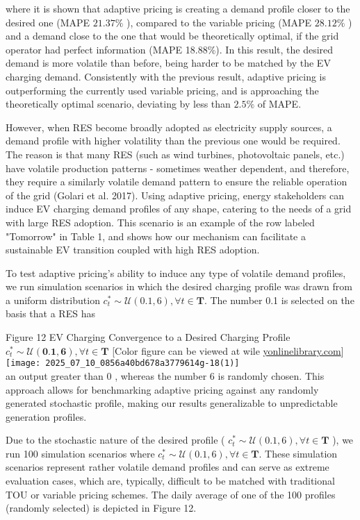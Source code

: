 \documentclass[10pt]{article}
\begin{document}
where it is shown that adaptive pricing is creating a demand profile closer to the desired one (MAPE $21.37 \%$ ), compared to the variable pricing (MAPE $28.12 \%$ ) and a demand close to the one that would be theoretically optimal, if the grid operator had perfect information (MAPE 18.88\%). In this result, the desired demand is more volatile than before, being harder to be matched by the EV charging demand. Consistently with the previous result, adaptive pricing is outperforming the currently used variable pricing, and is approaching the theoretically optimal scenario, deviating by less than $2.5 \%$ of MAPE.

However, when RES become broadly adopted as electricity supply sources, a demand profile with higher volatility than the previous one would be required. The reason is that many RES (such as wind turbines, photovoltaic panels, etc.) have volatile production patterns - sometimes weather dependent, and therefore, they require a similarly volatile demand pattern to ensure the reliable operation of the grid (Golari et al. 2017). Using adaptive pricing, energy stakeholders can induce EV charging demand profiles of any shape, catering to the needs of a grid with large RES adoption. This scenario is an example of the row labeled "Tomorrow" in Table 1, and shows how our mechanism can facilitate a sustainable EV transition coupled with high RES adoption.

To test adaptive pricing's ability to induce any type of volatile demand profiles, we run simulation scenarios in which the desired charging profile was drawn from a uniform distribution $c_{t}^{*} \sim \mathcal{U}(0.1,6), \forall t \in \mathbf{T}$. The number 0.1 is selected on the basis that a RES has

Figure 12 EV Charging Convergence to a Desired Charging Profile $c_{t}^{*} \sim \mathcal{U}(\mathbf{0 . 1}, \mathbf{6}), \forall t \in \mathbf{T}$ [Color figure can be viewed at wile \href{http://yonlinelibrary.com}{yonlinelibrary.com}]\\
\texttt{[image: 2025\_07\_10\_0856a40bd678a3779614g-18(1)]}\\
an output greater than 0 , whereas the number 6 is randomly chosen. This approach allows for benchmarking adaptive pricing against any randomly generated stochastic profile, making our results generalizable to unpredictable generation profiles.

Due to the stochastic nature of the desired profile ( $c_{t}^{*} \sim \mathcal{U}(0.1,6), \forall t \in \mathbf{T}$ ), we run 100 simulation scenarios where $c_{t}^{*} \sim \mathcal{U}(0.1,6), \forall t \in \mathbf{T}$. These simulation scenarios represent rather volatile demand profiles and can serve as extreme evaluation cases, which are, typically, difficult to be matched with traditional TOU or variable pricing schemes. The daily average of one of the 100 profiles (randomly selected) is depicted in Figure 12.
\end{document}
